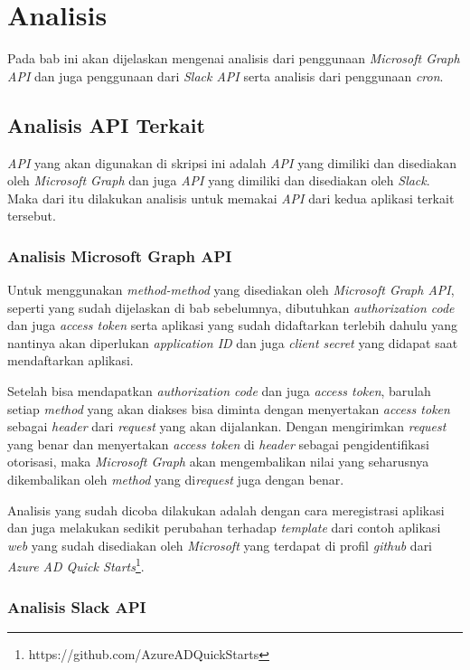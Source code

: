 \chapter{Analisis}
\label{chap:analisis}

Pada bab ini akan dijelaskan mengenai analisis dari penggunaan \textit{Microsoft Graph API} dan juga penggunaan dari \textit{Slack API} serta analisis dari penggunaan \textit{cron}. 

\section{Analisis API Terkait}
\label{sec:analisis_api_terkait}

\textit{API} yang akan digunakan di skripsi ini adalah \textit{API} yang dimiliki dan disediakan oleh \textit{Microsoft Graph} dan juga \textit{API} yang dimiliki dan disediakan oleh \textit{Slack}. Maka dari itu dilakukan analisis untuk memakai \textit{API} dari kedua aplikasi terkait tersebut. 

\subsection{Analisis Microsoft Graph API}
Untuk menggunakan \textit{method-method} yang disediakan oleh \textit{Microsoft Graph API}, seperti yang sudah dijelaskan di bab sebelumnya, dibutuhkan \textit{authorization code} dan juga \textit{access token} serta aplikasi yang sudah didaftarkan terlebih dahulu yang nantinya akan diperlukan \textit{application ID} dan juga \textit{client secret} yang didapat saat mendaftarkan aplikasi. 

Setelah bisa mendapatkan \textit{authorization code} dan juga \textit{access token}, barulah setiap \textit{method} yang akan diakses bisa diminta dengan menyertakan \textit{access token} sebagai \textit{header} dari \textit{request} yang akan dijalankan. Dengan mengirimkan \textit{request} yang benar dan menyertakan \textit{access token} di \textit{header} sebagai pengidentifikasi otorisasi, maka \textit{Microsoft Graph} akan mengembalikan nilai yang seharusnya dikembalikan oleh \textit{method} yang di\textit{request} juga dengan benar. 

Analisis yang sudah dicoba dilakukan adalah dengan cara meregistrasi aplikasi dan juga melakukan sedikit perubahan terhadap \textit{template} dari contoh aplikasi \textit{web} yang sudah disediakan oleh \textit{Microsoft} yang terdapat di profil \textit{github} dari \textit{Azure AD Quick Starts}\footnote{https://github.com/AzureADQuickStarts}. 

\subsection{Analisis Slack API}